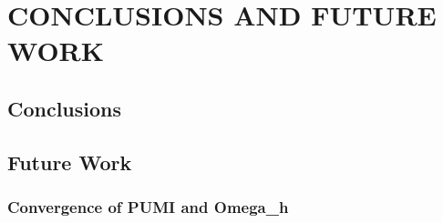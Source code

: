 
\chapter{CONCLUSIONS AND FUTURE WORK}

\section{Conclusions}

\section{Future Work}

\subsection{Convergence of PUMI and Omega\_h}


